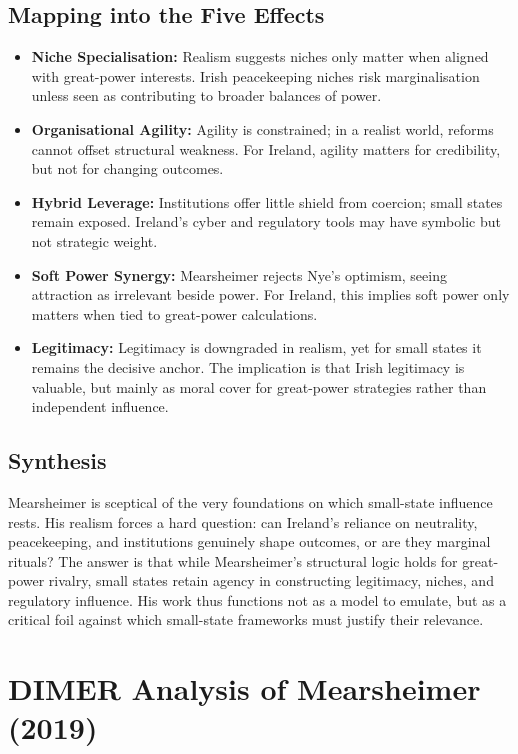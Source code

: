 \subsection*{Mapping into the Five Effects}

\begin{itemize}
	\item \textbf{Niche Specialisation:} Realism suggests niches only matter when aligned with great-power interests. Irish peacekeeping niches risk marginalisation unless seen as contributing to broader balances of power.
	\item \textbf{Organisational Agility:} Agility is constrained; in a realist world, reforms cannot offset structural weakness. For Ireland, agility matters for credibility, but not for changing outcomes.
	\item \textbf{Hybrid Leverage:} Institutions offer little shield from coercion; small states remain exposed. Ireland’s cyber and regulatory tools may have symbolic but not strategic weight.
	\item \textbf{Soft Power Synergy:} Mearsheimer rejects Nye’s optimism, seeing attraction as irrelevant beside power. For Ireland, this implies soft power only matters when tied to great-power calculations.
	\item \textbf{Legitimacy:} Legitimacy is downgraded in realism, yet for small states it remains the decisive anchor. The implication is that Irish legitimacy is valuable, but mainly as moral cover for great-power strategies rather than independent influence.
\end{itemize}

\subsection*{Synthesis}
Mearsheimer is sceptical of the very foundations on which small-state influence rests. His realism forces a hard question: can Ireland’s reliance on neutrality, peacekeeping, and institutions genuinely shape outcomes, or are they marginal rituals? The answer is that while Mearsheimer’s structural logic holds for great-power rivalry, small states retain agency in constructing legitimacy, niches, and regulatory influence. His work thus functions not as a model to emulate, but as a critical foil against which small-state frameworks must justify their relevance.


\section*{DIMER Analysis of Mearsheimer (2019)}

